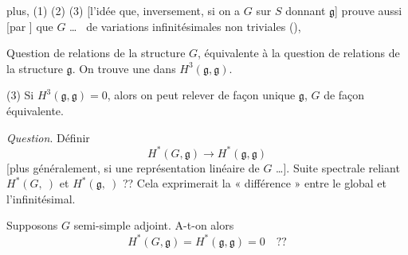 \documentclass[11pt,a4paper]{article}
\begin{document}

 plus, (1) (2) (3) [l'idée que, inversement,
si on a $G$ \struck{\ill{}} sur $S$ donnant $\mathfrak{g}$] prouve
aussi [par \ill{}] que $G$ \ldots\  de variations
infinitésimales non triviales (),

Question de relations de la structure $G$, équivalente à la question de
relations de la structure $\mathfrak{g}$. On trouve une
 dans $H^3(\mathfrak{g}, \mathfrak{g})$. \ill{}

(3) Si $H^3(\mathfrak{g}, \mathfrak{g}) = 0$, alors on peut relever de
façon unique $\mathfrak{g}$,  $G$ de façon équivalente.

\emph{Question}. Définir
\[
H^*(G, \mathfrak{g}) \longrightarrow H^*(\mathfrak{g}, \mathfrak{g})
\]
[plus généralement, si \ill{} \ill{} une représentation linéaire
de $G$ \ldots]. Suite spectrale reliant $H^*(G, \ )$ et
$H^*(\mathfrak{g}, \ )$ ?? Cela exprimerait la
« différence » entre le global et l'infinitésimal.

Supposons $G$ semi-simple adjoint. A-t-on alors
\[
H^*(G, \mathfrak{g}) = H^*(\mathfrak{g}, \mathfrak{g}) = 0 \quad ??
\]
\end{document}

